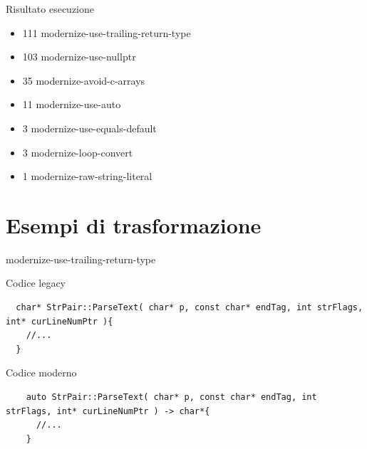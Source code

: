 \documentclass[aspectratio=169]{beamer}
\begin{document}
\begin{frame}
  \begin{block}{Risultato esecuzione}
    \begin{itemize}
  \item 111 modernize-use-trailing-return-type
  \item 103 modernize-use-nullptr
  \item 35 modernize-avoid-c-arrays
  \item 11 modernize-use-auto
  \item 3 modernize-use-equals-default
  \item 3 modernize-loop-convert
  \item 1 modernize-raw-string-literal
  \end{itemize}
  \end{block}
\end{frame}


\section{Esempi di trasformazione}


\begin{frame}[fragile]{modernize-use-trailing-return-type}
  \begin{block}{Codice legacy}
  \begin{lstlisting}
  char* StrPair::ParseText( char* p, const char* endTag, int strFlags, int* curLineNumPtr ){
    //... 
  }

   \end{lstlisting}
 \end{block}

 \begin{block}{Codice moderno}
    \begin{lstlisting}
    auto StrPair::ParseText( char* p, const char* endTag, int strFlags, int* curLineNumPtr ) -> char*{
      //... 
    }

    \end{lstlisting}
  \end{block}
\end{frame}


\end{document}
